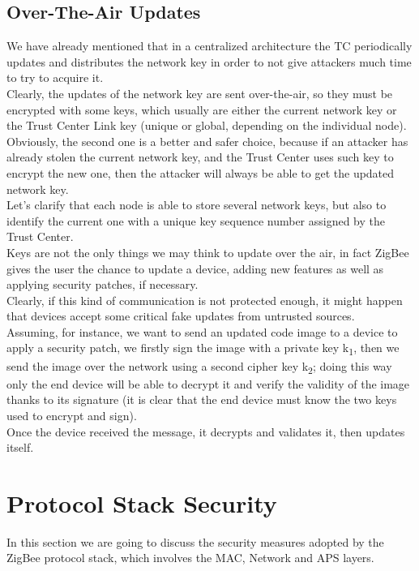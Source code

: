 \documentclass[12pt]{report}
\begin{document}
\subsection{Over-The-Air Updates}
\bigskip
We have already mentioned that in a centralized architecture the TC periodically updates and distributes the network key in order to not give attackers much time to try to acquire it.\\
Clearly, the updates of the network key are sent over-the-air, so they must be encrypted with some keys, which usually are either the current network key or the Trust Center Link key (unique or global, depending on the individual node).\\
Obviously, the second one is a better and safer choice, because if an attacker has already stolen the current network key, and the Trust Center uses such key to encrypt the new one, then the attacker will always be able to get the updated network key.\\
Let's clarify that each node is able to store several network keys, but also to identify the current one with a unique key sequence number assigned by the Trust Center.\\

Keys are not the only things we may think to update over the air, in fact ZigBee gives the user the chance to update a device, adding new features as well as applying security patches, if necessary.\\
Clearly, if this kind of communication is not protected enough, it might happen that devices accept some critical fake updates from untrusted sources.\\
Assuming, for instance, we want to send an updated code image to a device to apply a security patch, we firstly sign the image with a private key k\textsubscript{1}, then we send the image over the network using a second cipher key k\textsubscript{2}; doing this way only the end device will be able to decrypt it and verify the validity of the image thanks to its signature (it is clear that the end device must know the two keys used to encrypt and sign).\\
Once the device received the message, it decrypts and validates it, then updates itself.\\

\clearpage
\section{Protocol Stack Security}
\bigskip
In this section we are going to discuss the security measures adopted by the ZigBee protocol stack, which involves the MAC, Network and APS layers.\\
\end{document}
